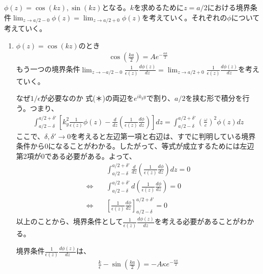 \documentclass[a4paper,11pt,dvipdfmx]{jsarticle}
\begin{document}
\begin{enumerate}
\begin{enumerate}
      $\phi (z) = \cos (kz), \sin (kz)$となる。$k$を求めるために$z = a / 2$における境界条件$\displaystyle \lim_{z \to a / 2 -0} \phi(z) = \lim_{z \to a / 2 + 0} \phi(z)$を考えていく。それぞれの$\phi$について考えていく。
    \end{enumerate}
      \begin{enumerate}
        \item $\phi(z) = \cos (kz)$のとき \\
        \begin{align*}
          \cos \left( \frac{ka}{2} \right) =  A e^{- \frac{\kappa a}{2}}
        \end{align*}
        もう一つの境界条件$\displaystyle \lim_{z \to -a / 2 - 0} \frac{1}{\epsilon(z)}\frac{d \phi(z)}{dz} = \lim_{z \to a / 2 + 0} \frac{1}{\epsilon(z)}\frac{d \phi(z)}{dz}$を考えていく。
        \begin{itembox}[l]{なぜ$1/\epsilon$が必要なのか}
          式(＊)の両辺を$e^{ik_y y}$で割り、$a/2$を挟む形で積分を行う。つまり、
          \begin{align*}
            \int_{a/2 - \delta}^{a/2 + \delta'} \left[  k_y^2 \frac{1}{\epsilon(z)}\phi(z) - \frac{d}{dz} \left( \frac{1}{\epsilon (z)} \frac{d \phi }{dz} \right) \right]dz = \int_{a/2 - \delta}^{a/2 + \delta'} \left( \frac{ \omega }{c} \right)^2 \phi(z) dz
          \end{align*}
          ここで、$\delta, \delta' \to 0$を考えると左辺第一項と右辺は、すでに判明している境界条件から0になることがわかる。したがって、等式が成立するためには左辺第2項が0である必要がある。よって、
          \begin{align*}
            & \quad \int_{a/2 - \delta}^{a/2 + \delta'} \frac{d}{dz} \left(  \frac{1}{\epsilon (z)} \frac{d \phi }{dz} \right)dz = 0
            \\
            \Longleftrightarrow & \quad \int_{a / 2 - \delta}^{a / 2 + \delta'} d \left( \frac{1}{\epsilon (z)} \frac{d \phi }{dz} \right) = 0
            \\
            \Longleftrightarrow & \quad \left[  \frac{1}{\epsilon (z)} \frac{d \phi }{dz} \right]_{a/2 - \delta}^{a / 2 + \delta'} = 0
          \end{align*}
          以上のことから、境界条件として$\displaystyle \frac{1}{\epsilon(z)} \frac{d \phi(z)}{dz}$を考える必要があることがわかる。
        \end{itembox}
        境界条件$ \displaystyle \frac{1}{\epsilon (z)} \frac{d \phi(z)}{dz}$は、
        \begin{align*}
          \frac{k}{\epsilon} - \sin \left( \frac{ka}{2} \right) = - A \kappa e^{- \frac{\kappa a}{2}}

\end{align*}
\end{enumerate}
\end{enumerate}
\end{document}

